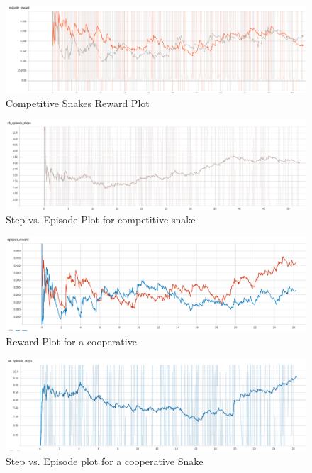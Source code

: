 \documentclass[conference,10pt]{IEEEtran}
\begin{document}
	\begin{figure}[]
		
		\includegraphics[width = \linewidth]{plot/snake_comp_reward.png}
		\caption{Competitive Snakes Reward Plot}
		\label{rcms}
		
	\end{figure}
	\begin{figure}[]
		
		\includegraphics[width = \linewidth]{plot/snake_comp_step.png}
		\caption{Step vs. Episode Plot for competitive snake}
		\label{scms}
		
	\end{figure}
	\begin{figure}[]
		
		\includegraphics[width = \linewidth]{plot/snake_coop_reward.png}
		\caption{Reward Plot for a cooperative}
		\label{rcos}
		
	\end{figure}
	\begin{figure}[]
		
		\includegraphics[width = \linewidth]{plot/snake_coop_step.png}
		\caption{Step vs. Episode plot for a cooperative Snake}
		\label{scos}
		
	\end{figure}
\end{document}
